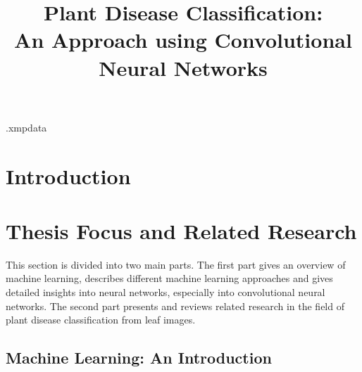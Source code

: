 \documentclass{BachelorBUI}
\title{Plant Disease Classification:\\[0.5em]\LARGE An Approach using Convolutional Neural Networks}
\begin{document}
\begin{filecontents}[overwrite]{\jobname.xmpdata}
\makeatletter
\Title{\@title}
\Author{\@authorname}
\Language{\@thesislanguage}
\Keywords{\@keywords}
\makeatother
\end{filecontents}

\maketitle

\begin{abstract}
\end{abstract}

\clearpage
\tableofcontents

\clearpage
\section{Introduction}


\section{Thesis Focus and Related Research}

    This section is divided into two main parts. The first part gives an overview of machine learning, describes different machine learning approaches and gives detailed insights into neural networks, especially into convolutional neural networks. The second part presents and reviews related research in the field of plant disease classification from leaf images.

    \subsection{Machine Learning: An Introduction}
    \label{sec:machine-learning-overveiw}
\end{document}
